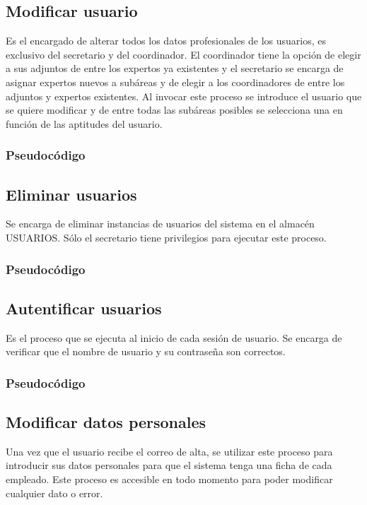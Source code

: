 \documentclass[12pt,a4paper,spanish,twoside]{book}
\begin{document}
\subsection{Modificar usuario}
Es el encargado de alterar todos los datos profesionales de los usuarios, es
exclusivo del secretario y del coordinador. El coordinador tiene la opción de
elegir a sus adjuntos de entre los expertos ya existentes y el secretario se
encarga de asignar expertos nuevos a subáreas y de elegir a los coordinadores
de entre los adjuntos y expertos existentes. Al invocar este proceso se
introduce el usuario que se quiere modificar y de entre todas las subáreas
posibles se selecciona una en función de las aptitudes del usuario. 

\subsubsection{Pseudocódigo}

\subsection{Eliminar usuarios}
Se encarga de eliminar instancias de usuarios del sistema en el almacén 
USUARIOS. Sólo el secretario tiene privilegios para ejecutar este proceso. 

\subsubsection{Pseudocódigo}

\subsection{Autentificar usuarios}
Es el proceso que se ejecuta al inicio de cada sesión de usuario. Se encarga
de verificar que el nombre de usuario y su contraseña son correctos.

\subsubsection{Pseudocódigo}

\subsection{Modificar datos personales}
Una vez que el usuario recibe el correo de alta, se utilizar este proceso para 
introducir sus datos personales para que el sistema tenga una ficha de cada 
empleado. Este proceso es accesible en todo momento para poder modificar 
cualquier dato o error.
\end{document}
